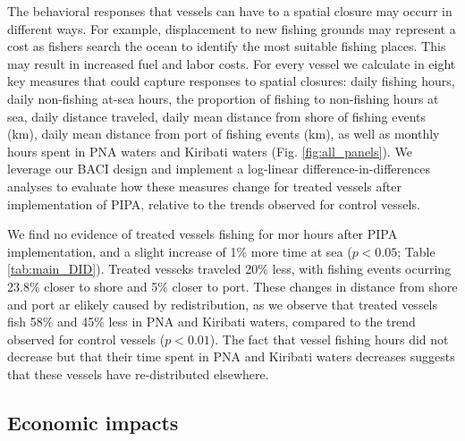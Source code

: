 \documentclass[9p,twocolumn,twoside,lineno]{pnas-new}
\begin{document}
The behavioral responses that vessels can have to a spatial closure may occurr in different ways.
For example, displacement to new fishing grounds may represent a cost as fishers search the ocean
to identify the most suitable fishing places. This may result in increased fuel and labor costs. For every vessel we calculate in eight key measures that could capture responses to spatial closures: daily fishing hours, daily non-fishing at-sea hours, the proportion of fishing to non-fishing hours at sea, daily distance traveled, daily mean distance from shore of fishing events (km), daily mean distance from port of fishing events (km), as well as monthly hours spent in PNA waters and Kiribati waters (Fig. \ref{fig:all_panels}). We leverage our BACI design and implement a log-linear difference-in-differences analyses to evaluate how these measures change for treated vessels after implementation of PIPA, relative to the trends observed for control vessels.

We find no evidence of treated vessels fishing for mor hours after PIPA implementation, and a slight increase of 1\% more time at sea ($p < 0.05$; Table \ref{tab:main_DID}). Treated vesseks traveled 20\% less, with fishing events ocurring 23.8\% closer to shore and 5\% closer to port. These changes in distance from shore and port ar elikely caused by redistribution, as we observe that treated vessels fish 58\% and 45\% less in PNA and Kiribati waters, compared to the trend observed for control vessels ($p < 0.01$). The fact that vessel fishing hours did not decrease but that their time spent in PNA and Kiribati waters decreases suggests that these vessels have re-distributed elsewhere.

\subsection{Economic impacts}
\end{document}
